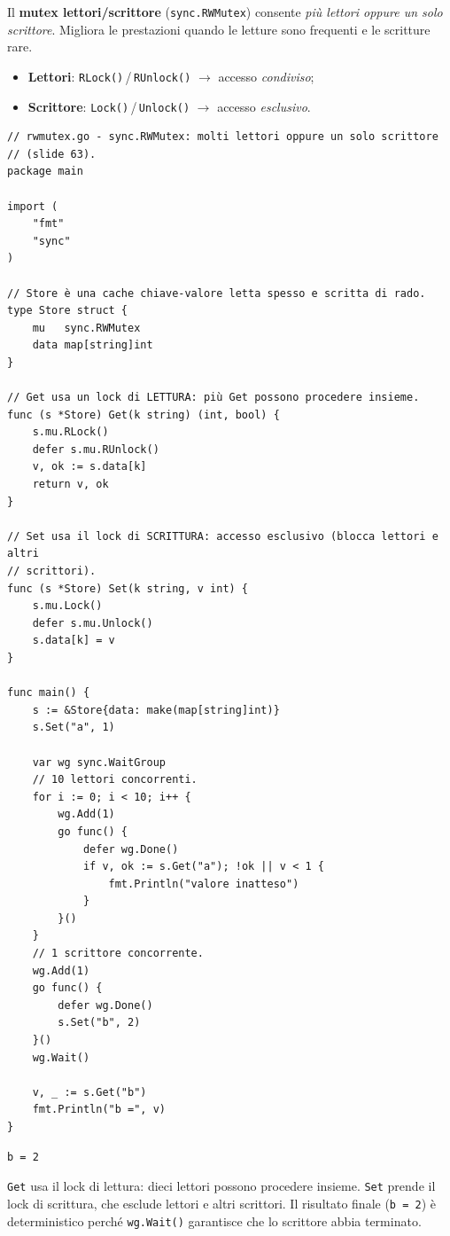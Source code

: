 \documentclass[11pt,a4paper]{report}
\newcommand{\cod}[1]{\texttt{#1}}
\begin{document}
Il \textbf{mutex lettori/scrittore} (\cod{sync.RWMutex}) consente \emph{più
lettori oppure un solo scrittore}. Migliora le prestazioni quando le letture
sono frequenti e le scritture rare.

\begin{itemize}
  \item \textbf{Lettori}: \cod{RLock()}\,/\,\cod{RUnlock()} $\to$ accesso
        \emph{condiviso};
  \item \textbf{Scrittore}: \cod{Lock()}\,/\,\cod{Unlock()} $\to$ accesso
        \emph{esclusivo}.
\end{itemize}

\begin{lstlisting}[style=gocode,caption={\texttt{06\_concurrency/rwmutex.go}}]
// rwmutex.go - sync.RWMutex: molti lettori oppure un solo scrittore
// (slide 63).
package main

import (
	"fmt"
	"sync"
)

// Store è una cache chiave-valore letta spesso e scritta di rado.
type Store struct {
	mu   sync.RWMutex
	data map[string]int
}

// Get usa un lock di LETTURA: più Get possono procedere insieme.
func (s *Store) Get(k string) (int, bool) {
	s.mu.RLock()
	defer s.mu.RUnlock()
	v, ok := s.data[k]
	return v, ok
}

// Set usa il lock di SCRITTURA: accesso esclusivo (blocca lettori e altri
// scrittori).
func (s *Store) Set(k string, v int) {
	s.mu.Lock()
	defer s.mu.Unlock()
	s.data[k] = v
}

func main() {
	s := &Store{data: make(map[string]int)}
	s.Set("a", 1)

	var wg sync.WaitGroup
	// 10 lettori concorrenti.
	for i := 0; i < 10; i++ {
		wg.Add(1)
		go func() {
			defer wg.Done()
			if v, ok := s.Get("a"); !ok || v < 1 {
				fmt.Println("valore inatteso")
			}
		}()
	}
	// 1 scrittore concorrente.
	wg.Add(1)
	go func() {
		defer wg.Done()
		s.Set("b", 2)
	}()
	wg.Wait()

	v, _ := s.Get("b")
	fmt.Println("b =", v)
}
\end{lstlisting}
\begin{lstlisting}[style=output]
b = 2
\end{lstlisting}

\cod{Get} usa il lock di lettura: dieci lettori possono procedere insieme.
\cod{Set} prende il lock di scrittura, che esclude lettori e altri scrittori. Il
risultato finale (\cod{b = 2}) è deterministico perché \cod{wg.Wait()} garantisce
che lo scrittore abbia terminato.
\end{document}
